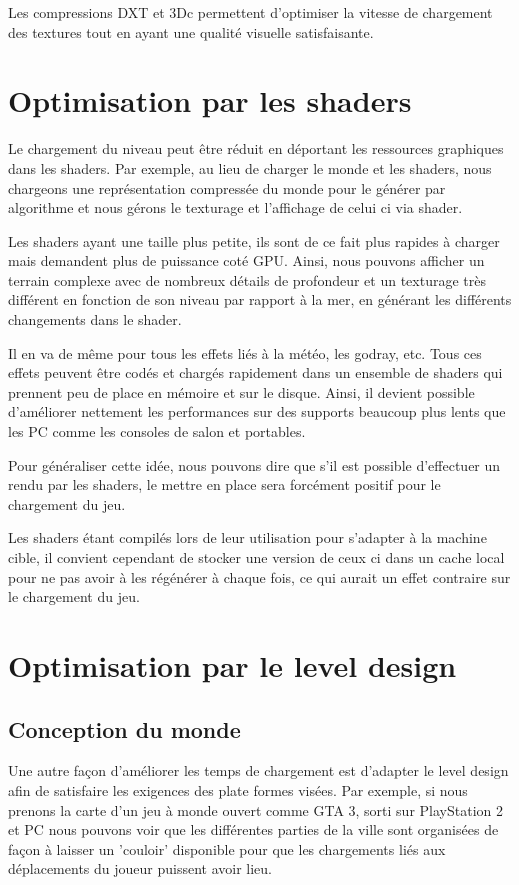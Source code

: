 \documentclass[a4paper, 12pt]{article} %
\begin{document}
Les compressions DXT et 3Dc permettent d'optimiser la vitesse de chargement des textures tout en ayant une qualité visuelle satisfaisante.

\newpage
\section{Optimisation par les shaders}
Le chargement du niveau peut être réduit en déportant les ressources graphiques dans les shaders. Par exemple, au lieu de charger le monde et les shaders, nous chargeons une représentation compressée du monde pour le générer par algorithme et nous gérons le texturage et l'affichage de celui ci via shader. 

Les shaders ayant une taille plus petite, ils sont de ce fait plus rapides à charger mais demandent plus de puissance coté GPU. Ainsi, nous pouvons afficher un terrain complexe avec de nombreux détails de profondeur et un texturage très différent en fonction de son niveau par rapport à la mer, en générant les différents changements dans le shader.

Il en va de même pour tous les effets liés à la météo, les godray, etc. Tous ces effets peuvent être codés et chargés rapidement dans un ensemble de shaders qui prennent peu de place en mémoire et sur le disque. Ainsi, il devient possible d'améliorer nettement les performances sur des supports beaucoup plus lents que les PC comme les consoles de salon et portables.

Pour généraliser cette idée, nous pouvons dire que s'il est possible d'effectuer un rendu par les shaders, le mettre en place sera forcément positif pour le chargement du jeu.

Les shaders étant compilés lors de leur utilisation pour s'adapter à la machine cible, il convient cependant de stocker une version de ceux ci dans un cache local pour ne pas avoir à les régénérer à chaque fois, ce qui aurait un effet contraire sur le chargement du jeu.

\newpage
\section{Optimisation par le level design}
\subsection{Conception du monde}
Une autre façon d'améliorer les temps de chargement est d'adapter le level design afin de satisfaire les exigences des plate formes visées. Par exemple, si nous prenons la carte d'un jeu à monde ouvert comme GTA 3, sorti sur PlayStation 2 et PC nous pouvons voir que les différentes parties de la ville sont organisées de façon à laisser un 'couloir' disponible pour que les chargements liés aux déplacements du joueur puissent avoir lieu.
\end{document}
